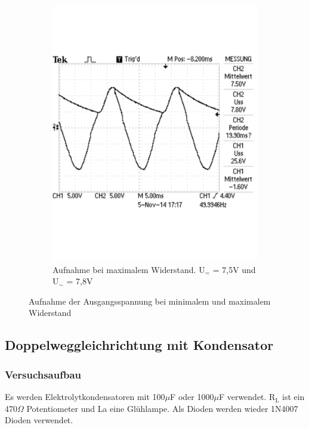 \documentclass[12pt,a4paper]{article}
\begin{document}
\begin{figure}[H]
\begin{subfigure}[b]{0.48\textwidth}
                \includegraphics[width=\textwidth , scale = 0.4]{2_4_100F_2.pdf}
                \caption[Aufnahme bei maximalem Widerstand. U$_{=}$ = 7,5V und U$_\sim$ = 7,8V]{Aufnahme bei maximalem Widerstand. U$_{=}$ = 7,5V und U$_\sim$ = 7,8V}
  				\label{fig:2_4_1000F_2}
        \end{subfigure}
        \caption{Aufnahme der Ausgangsspannung bei minimalem und maximalem Widerstand}
        \label{fig:2_4_1000F}
\end{figure}

\subsection{Doppelweggleichrichtung mit Kondensator}
\subsubsection{Versuchsaufbau}
Es werden Elektrolytkondensatoren mit 100$\mu$F oder 1000$\mu$F verwendet. R$_\text{L}$ ist ein 470$\Omega$ Potentiometer und La eine Glühlampe. Als Dioden werden wieder 1N4007 Dioden verwendet.
\end{document}
